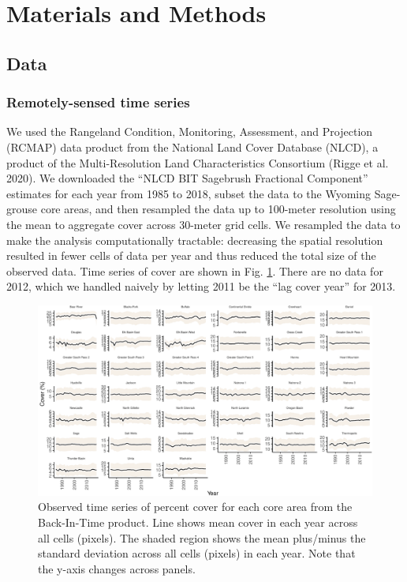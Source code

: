 \documentclass[
  12pt,
]{article}
\begin{document}
\hypertarget{materials-and-methods}{%
\section{Materials and Methods}\label{materials-and-methods}}

\hypertarget{data}{%
\subsection{Data}\label{data}}

\hypertarget{remotely-sensed-time-series}{%
\subsubsection{Remotely-sensed time series}\label{remotely-sensed-time-series}}

We used the Rangeland Condition, Monitoring, Assessment, and Projection (RCMAP) data product from the National Land Cover Database (NLCD), a product of the Multi-Resolution Land Characteristics Consortium (Rigge et al. 2020).
We downloaded the ``NLCD BIT Sagebrush Fractional Component'' estimates for each year from 1985 to 2018, subset the data to the Wyoming Sage-grouse core areas, and then resampled the data up to 100-meter resolution using the mean to aggregate cover across 30-meter grid cells.
We resampled the data to make the analysis computationally tractable: decreasing the spatial resolution resulted in fewer cells of data per year and thus reduced the total size of the observed data.
Time series of cover are shown in Fig. \ref{fig:data}.
There are no data for 2012, which we handled naively by letting 2011 be the ``lag cover year'' for 2013.

\begin{figure}
\centering
\includegraphics{sageCastManuscript_files/figure-latex/data-1.pdf}
\caption{\label{fig:data}Observed time series of percent cover for each core area from the Back-In-Time product. Line shows mean cover in each year across all cells (pixels). The shaded region shows the mean plus/minus the standard deviation across all cells (pixels) in each year. Note that the y-axis changes across panels.}
\end{figure}
\end{document}
